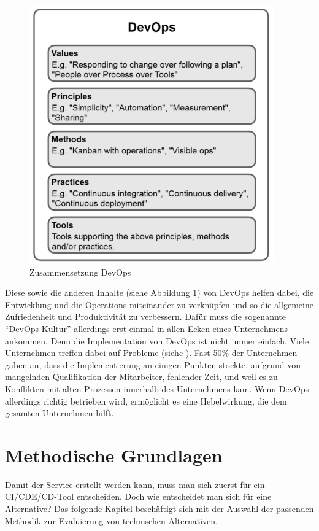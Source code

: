 \begin{figure}[h!]
	\centering
	\includegraphics[scale = 0.7]{img/DEVOPS.png}
	\caption{Zusammensetzung DevOps}
	\label{img:devops}
\end{figure}Diese sowie die anderen Inhalte (siehe Abbildung \ref{img:devops}) von DevOps helfen dabei, die Entwicklung und die Operations miteinander zu verknüpfen und so die allgemeine Zufriedenheit und Produktivität zu verbessern. Dafür muss die sogenannte \enquote{DevOps-Kultur} allerdings erst einmal in allen Ecken eines Unternehmens ankommen.\autocite[Vgl.][S.23]{Stahl.2018} Denn die Implementation von DevOps ist nicht immer einfach. Viele Unternehmen treffen dabei auf Probleme (siehe \cite{Claranet.2016}). Fast 50\% der Unternehmen gaben an, dass die Implementierung an einigen Punkten stockte, aufgrund von mangelnden Qualifikation der Mitarbeiter, fehlender Zeit, und weil es zu Konflikten mit alten Prozessen innerhalb des Unternehmens kam.\autocite[Vgl.][]{Claranet.2016} Wenn DevOps allerdings richtig betrieben wird, ermöglicht es eine Hebelwirkung, die dem gesamten Unternehmen hilft.\autocite[Vgl.][S.24]{Stahl.2018} 
\chapter{Methodische Grundlagen}
Damit der Service erstellt werden kann, muss man sich zuerst für ein \ac{CI}/\ac{CDE}/\ac{CD}-Tool entscheiden. Doch wie entscheidet man sich für eine Alternative? Das folgende Kapitel beschäftigt sich mit der Auswahl der passenden Methodik zur Evaluierung von technischen Alternativen.
